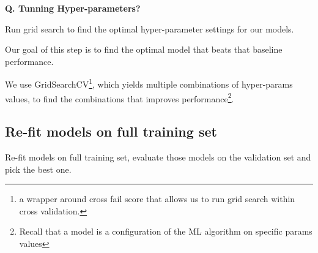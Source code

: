 \begin{frame}[fragile]{\textbf{Q. Tunning Hyper-parameters?}}
  \begin{wideitemize}
    \item Run grid search to find the optimal hyper-parameter settings for our models.
    \item Our goal of this step is to find the optimal model that beats that baseline performance.
    \item We use GridSearchCV\footnote{a wrapper around cross fail score that allows us to
    run grid search within cross validation.}, which yields multiple combinations of hyper-params
    values, to find the combinations that improves performance\footnote{Recall that a model is a
    configuration of the ML algorithm on specific params values}.
  \end{wideitemize}
\end{frame}

\subsection{Re-fit models on full training set}
\begin{transitionsubframe}
  \begin{center}
    \Huge Re-fit models on full training set, evaluate those models
    on the validation set and pick the best one.
  \end{center}
\end{transitionsubframe}

